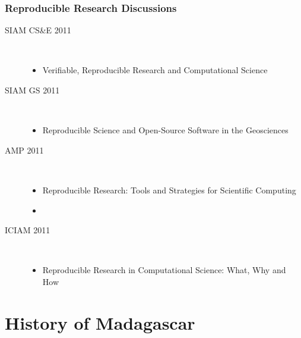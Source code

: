 \begin{frame}
 \frametitle{Reproducible Research Discussions}

 \begin{description}
    \item[SIAM CS\&E 2011] \ 
    \begin{itemize}   
    \item Verifiable, Reproducible Research and Computational Science
    \end{itemize}
    \item[SIAM GS 2011] \
    \begin{itemize}   
    \item Reproducible Science and Open-Source Software in the Geosciences
    \end{itemize}
    \item[AMP 2011] \
    \begin{itemize}   
    \item  Reproducible Research: Tools and Strategies for Scientific Computing
    \item {}
    \end{itemize}
    \item[ICIAM 2011] \
    \begin{itemize}
    \item Reproducible Research in Computational Science: What, Why and How
    \end{itemize}
    \end{description}
  \end{frame} 


\section{History of Madagascar}

